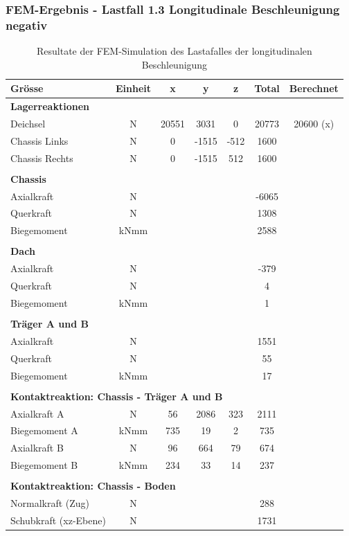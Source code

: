   \subsubsection{FEM-Ergebnis - Lastfall 1.3 Longitudinale Beschleunigung negativ}
  \begin{table}[H]
  \centering
  \begin{tabular}{lcccccc}
  Grösse	&	Einheit	&	x	&	y	&	z	&	Total	&	Berechnet	\\	\hline
  \multicolumn{5}{l}{\textbf{Lagerreaktionen}}									&		&		\\	\thickhline
  Deichsel	&	N	&	20551	&	3031	&	0	&	20773	&	20600 (x)	\\
  Chassis Links	&	N	&	0	&	-1515	&	-512	&	1600	&		\\
  Chassis Rechts	&	N	&	0	&	-1515	&	512	&	1600	&		\\	\hline	\\
  \multicolumn{5}{l}{\textbf{Chassis}}									&		&		\\	\thickhline
  Axialkraft	&	N	&		&		&		&	-6065	&		\\
  Querkraft	&	N	&		&		&		&	1308	&		\\
  Biegemoment	&	kNmm	&		&		&		&	2588	&		\\	\hline	\\
  \multicolumn{5}{l}{\textbf{Dach}}									&		&		\\	\thickhline
  Axialkraft	&	N	&		&		&		&	-379	&		\\
  Querkraft	&	N	&		&		&		&	4	&		\\
  Biegemoment	&	kNmm	&		&		&		&	1	&		\\	\hline	\\
  \multicolumn{5}{l}{\textbf{Träger A und B}}													\\	\thickhline
  Axialkraft	&	N	&		&		&		&	1551	&		\\
  Querkraft	&	N	&		&		&		&	55	&		\\
  Biegemoment	&	kNmm	&		&		&		&	17	&		\\	\hline	\\
  \multicolumn{5}{l}{\textbf{Kontaktreaktion: Chassis - Träger A und B}}									&		&		\\	\thickhline
  Axialkraft A	&	N	&	56	&	2086	&	323	&	2111	&		\\
  Biegemoment A	&	kNmm	&	735	&	19	&	2	&	735	&		\\
  Axialkraft B	&	N	&	96	&	664	&	79	&	674	&		\\
  Biegemoment B	&	kNmm	&	234	&	33	&	14	&	237	&		\\	\hline	\\
  \multicolumn{5}{l}{\textbf{Kontaktreaktion: Chassis - Boden}}									&		&		\\	\thickhline
  Normalkraft (Zug)	&	N	&		&		&		&	288	&		\\
  Schubkraft (xz-Ebene)	&	N	&		&		&		&	1731	&		\\	\hline
  \end{tabular}
  \caption{Resultate der FEM-Simulation des Lastafalles der longitudinalen Beschleunigung}
  \label{tab:FEM 1.3}
  \end{table}



